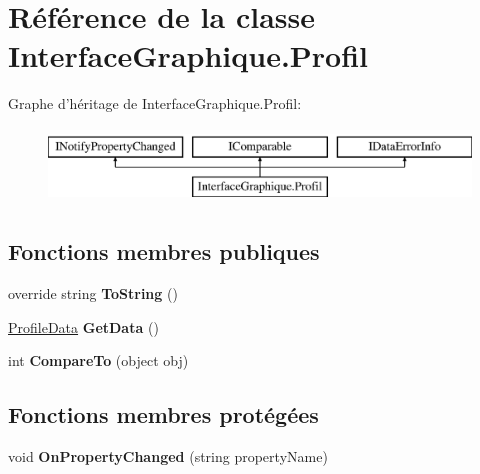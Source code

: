 \hypertarget{class_interface_graphique_1_1_profil}{\section{Référence de la classe Interface\-Graphique.\-Profil}
\label{class_interface_graphique_1_1_profil}
}
Graphe d'héritage de Interface\-Graphique.\-Profil\-:\begin{figure}[H]
\begin{center}
\leavevmode
\includegraphics[height=2.000000cm]{class_interface_graphique_1_1_profil}
\end{center}
\end{figure}
\subsection*{Fonctions membres publiques}
\begin{DoxyCompactItemize}
\item 
\hypertarget{class_interface_graphique_1_1_profil_adea1e6124ca77290a68ae1a26431fea6}{override string {\bfseries To\-String} ()}\label{class_interface_graphique_1_1_profil_adea1e6124ca77290a68ae1a26431fea6}

\item 
\hypertarget{class_interface_graphique_1_1_profil_aca951f6077b570827c9b0bde7e25751d}{\hyperlink{struct_interface_graphique_1_1_profile_data}{Profile\-Data} {\bfseries Get\-Data} ()}\label{class_interface_graphique_1_1_profil_aca951f6077b570827c9b0bde7e25751d}

\item 
\hypertarget{class_interface_graphique_1_1_profil_a6f6a65db92047905c3438bc012ad225a}{int {\bfseries Compare\-To} (object obj)}\label{class_interface_graphique_1_1_profil_a6f6a65db92047905c3438bc012ad225a}

\end{DoxyCompactItemize}
\subsection*{Fonctions membres protégées}
\begin{DoxyCompactItemize}
\item 
\hypertarget{class_interface_graphique_1_1_profil_a60b93f6a2d7a2e4cc59444c747b7c4e1}{void {\bfseries On\-Property\-Changed} (string property\-Name)}\label{class_interface_graphique_1_1_profil_a60b93f6a2d7a2e4cc59444c747b7c4e1}

\end{DoxyCompactItemize}
